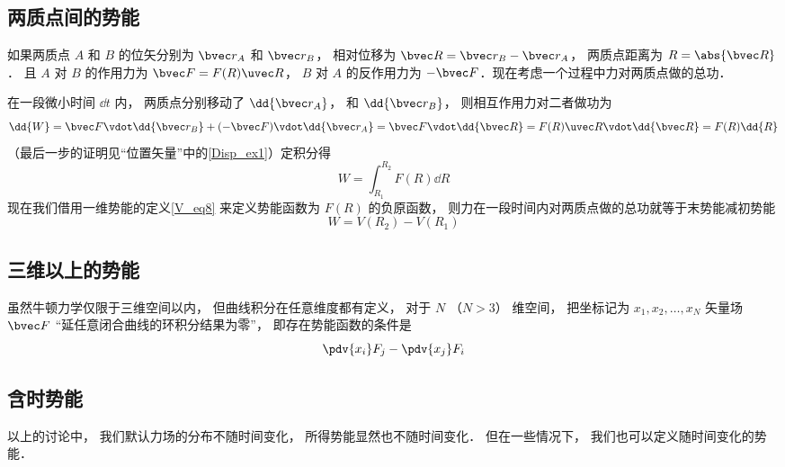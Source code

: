 \subsection{两质点间的势能}

如果两质点 $A$ 和 $B$ 的位矢分别为 $\bvec r_A$ 和 $\bvec r_B$， 相对位移为 $\bvec R = \bvec r_B - \bvec r_A$， 两质点距离为 $R = \abs{\bvec R}$． 且 $A$ 对 $B$ 的作用力为 $\bvec F = F(R) \uvec R$， $B$ 对 $A$ 的反作用力为 $-\bvec F$．现在考虑一个过程中力对两质点做的总功．

在一段微小时间 $\dd{t}$ 内， 两质点分别移动了 $\dd{\bvec r_A}$， 和 $\dd{\bvec r_B}$， 则相互作用力对二者做功为
\begin{equation}
\dd{W} = \bvec F \vdot \dd{\bvec r_B} + (- \bvec F) \vdot \dd{\bvec r_A} = \bvec F \vdot \dd{\bvec R}
= F(R)\uvec R\vdot \dd{\bvec R} = F(R) \dd{R}
\end{equation}
（最后一步的证明见“位置矢量”中的\autoref{Disp_ex1}）定积分得
\begin{equation}
W = \int_{R_1}^{R_2}  F(R) \dd{R}
\end{equation}
现在我们借用一维势能的定义\autoref{V_eq8} 来定义势能函数为 $F(R)$ 的负原函数， 则力在一段时间内对两质点做的总功就等于末势能减初势能
\begin{equation}\label{V_eq20}
W = V(R_2) - V(R_1)
\end{equation}

\subsection{三维以上的势能}
虽然牛顿力学仅限于三维空间以内， 但曲线积分在任意维度都有定义， 对于 $N$ （$N > 3$） 维空间， 把坐标记为 $x_1, x_2, \dots, x_N$ 矢量场 $\bvec F$ “延任意闭合曲线的环积分结果为零”， 即存在势能函数的条件是
\begin{equation}
\pdv{x_i} F_j - \pdv{x_j} F_i
\end{equation}

\subsection{含时势能}
以上的讨论中， 我们默认力场的分布不随时间变化， 所得势能显然也不随时间变化． 但在一些情况下， 我们也可以定义随时间变化的势能．



